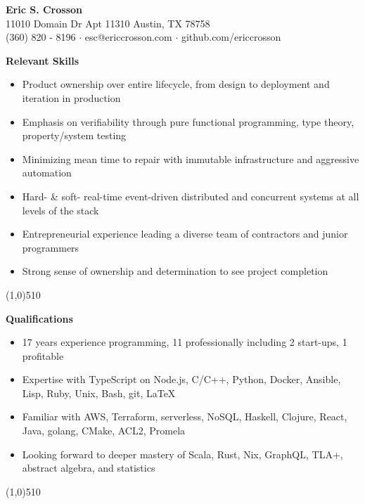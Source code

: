 \documentclass{report}
\newcommand{\cut}{\begin{center} \line(1,0){510} \end{center}}
\begin{document}
\pagestyle{empty}
\setlength\parindent{0pt}

\begin{center}
  \textbf{Eric S. Crosson} \\
  11010 Domain Dr Apt 11310 Austin, TX 78758 \\
  (360) 820 - 8196 $\cdot$ esc@ericcrosson.com $\cdot$ github.com/ericcrosson
\end{center}

% 

\textbf{Relevant Skills}
\begin{itemize}[label=$\cdot$]
\item Product ownership over entire lifecycle, from design to deployment and iteration in production
\item Emphasis on verifiability through pure functional programming, type theory, property/system testing
\item Minimizing mean time to repair with immutable infrastructure and aggressive automation 
\item Hard- \& soft- real-time event-driven distributed and concurrent systems at all levels of the stack
\item Entrepreneurial experience leading a diverse team of contractors and junior programmers
\item Strong sense of ownership and determination to see project completion
\end{itemize}

\cut{}

\textbf{Qualifications}
\begin{itemize}[label=$\cdot$]
\item 17 years experience programming, 11 professionally including 2 start-ups, 1 profitable
\item Expertise with TypeScript on Node.js, C/C++, Python, Docker, Ansible, Lisp, Ruby, Unix, Bash, git, \LaTeX{}
\item Familiar with AWS, Terraform, serverless, NoSQL, Haskell, Clojure, React, Java, golang, CMake, ACL2, Promela
\item Looking forward to deeper mastery of Scala, Rust, Nix, GraphQL, TLA+, abstract algebra, and statistics
\end{itemize}

\cut{}
\end{document}
